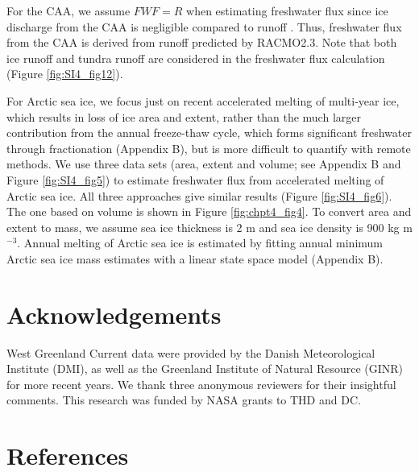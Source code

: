 For the CAA, we assume $FWF=R$ when estimating freshwater flux since ice discharge from the CAA is negligible compared to runoff \cite[]{gardner2011}. Thus, freshwater flux from the CAA is derived from runoff predicted by RACMO2.3.  Note that both ice runoff and tundra runoff are considered in the freshwater flux calculation (Figure \ref{fig:SI4_fig12}).

For Arctic sea ice, we focus just on recent accelerated melting of multi-year ice, which results in loss of ice area and extent, rather than the much larger contribution from the annual freeze-thaw cycle, which forms significant freshwater through fractionation (Appendix B), but is more difficult to quantify with remote methods.  We use three data sets (area, extent and volume; see Appendix B and Figure \ref{fig:SI4_fig5}) to estimate freshwater flux from accelerated melting of Arctic sea ice.  All three approaches give similar results (Figure \ref{fig:SI4_fig6}). The one based on volume is shown in Figure \ref{fig:chpt4_fig4}.  To convert area and extent to mass, we assume sea ice thickness is 2 m \cite[]{laxon2003} and sea ice density is 900 kg m$^{-3}$.  Annual melting of Arctic sea ice is estimated by fitting annual minimum Arctic sea ice mass estimates with a linear state space model (Appendix B).

\section{Acknowledgements}
West Greenland Current data were provided by the Danish Meteorological Institute (DMI), as well as the Greenland Institute of Natural Resource (GINR) for more recent years. We thank three anonymous reviewers for their insightful comments.  This research was funded by NASA grants to THD and DC.
 
\section{References}
  


